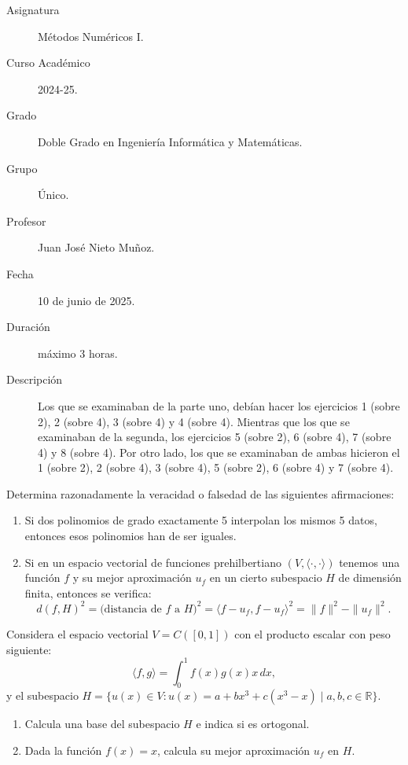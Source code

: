 \documentclass[12pt]{article}
\begin{document}
	
	
	
	
	
	\begin{description}
		\item[Asignatura] Métodos Numéricos I.
		\item[Curso Académico] 2024-25.
		\item[Grado] Doble Grado en Ingeniería Informática y Matemáticas.
		\item[Grupo] Único.
		\item[Profesor] Juan José Nieto Muñoz.
		\item[Fecha] 10 de junio de 2025.
		\item[Duración] máximo 3 horas.
		\item[Descripción] Los que se examinaban de la parte uno, debían hacer los ejercicios 1 (sobre 2), 2 (sobre 4), 3 (sobre 4) y 4 (sobre 4). Mientras que los que se examinaban de la segunda, los ejercicios 5 (sobre 2), 6 (sobre 4), 7 (sobre 4) y 8 (sobre 4). Por otro lado, los que se examinaban de ambas hicieron el  1 (sobre 2), 2 (sobre 4), 3 (sobre 4), 5 (sobre 2), 6 (sobre 4) y 7 (sobre 4).
	\end{description}
	\newpage
	
	\begin{ejercicio}
		Determina razonadamente la veracidad o falsedad de las siguientes afirmaciones:
		\begin{enumerate}[label=\alph*)]
			\item Si dos polinomios de grado exactamente 5 interpolan los mismos 5 datos, entonces esos polinomios han de ser iguales.
			
			\item Si en un espacio vectorial de funciones prehilbertiano $(V, \langle \cdot, \cdot \rangle)$ tenemos una función $f$ y su mejor aproximación $u_f$ en un cierto subespacio $H$ de dimensión finita, entonces se verifica:
			$$ d(f, H)^2 = \text{(distancia de } f \text{ a } H)^2 = \langle f - u_f, f - u_f \rangle^2 = \|f\|^2 - \|u_f\|^2.$$
		\end{enumerate}
	\end{ejercicio}
	
	\begin{ejercicio}
		Considera el espacio vectorial $V = C([0,1])$ con el producto escalar con peso siguiente:
		$$ \langle f, g \rangle = \int_0^1 f(x) g(x) x \, dx,$$
		y el subespacio $ H = \{ u(x) \in V : u(x) = a + b x^3 + c(x^3 - x) \mid a, b, c \in \mathbb{R} \}.$
		\begin{enumerate}[label=\alph*)]
			\item Calcula una base del subespacio $H$ e indica si es ortogonal.
			
			\item Dada la función $f(x) = x$, calcula su mejor aproximación $u_f$ en $H$.
		\end{enumerate}
	\end{ejercicio}
	
\end{document}
